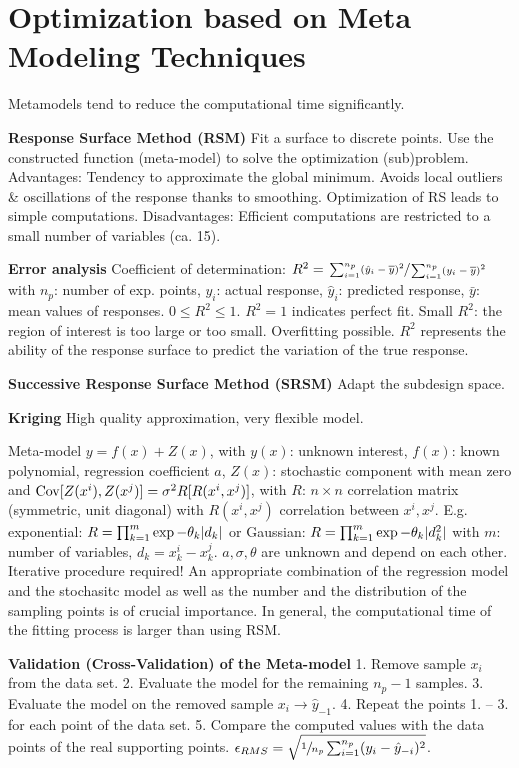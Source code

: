 \section*{Optimization based on Meta Modeling Techniques}
Metamodels tend to reduce the computational time significantly.

\textbf{Response Surface Method (RSM)}
Fit a surface to discrete points. Use the constructed function (meta-model) to solve the optimization (sub)problem.
Advantages: Tendency to approximate the global minimum. Avoids local outliers \& oscillations of the response thanks to smoothing. 
Optimization of RS leads to simple computations. 
Disadvantages: Efficient computations are restricted to a small number of variables (ca. 15).

\textbf{Error analysis}
Coefficient of determination:
$R^2 = \sfrac{\sum_{i=1}^{n_p} (\hat{y}_i-\overline{y})^2}{\sum_{i=1}^{n_p} (y_i-\overline{y})^2}$
with $n_p$: number of exp. points, $y_i$: actual response, $\hat{y}_i$: predicted response, $\bar{y}$: mean values of responses.
$0\leq R^2 \leq 1$. $R^2=1$ indicates perfect fit.
Small $R^2$: the region of interest is too large or too small.
Overfitting possible. 
$R^2$ represents the ability of the response surface to predict the variation of the true response.

\textbf{Successive Response Surface Method (SRSM)}
Adapt the subdesign space.

\textbf{Kriging}
High quality approximation, very flexible model. 

Meta-model $y=f(x)+Z(x)$, with $y(x)$: unknown interest, $f(x)$: known polynomial, regression coefficient $a$, $Z(x)$: stochastic component with mean zero and $\mathrm{Cov}{[Z(x^i), Z(x^j)]} = \sigma^2 R[R(x^i, x^j)]$, with $R$: $n\times n$ correlation matrix (symmetric, unit diagonal) with $R(x^i, x^j)$ correlation between $x^i, x^j$.
E.g. exponential: $R=\prod_{k=1}^{m}\exp{-\theta_k \lvert d_k \rvert}$ or Gaussian: $R=\prod_{k=1}^{m}\exp{-\theta_k \lvert d_k^2 \rvert}$ with $m$: number of variables, $d_k=x_k^i - x_k ^j$.
$a, \sigma, \theta$ are unknown and depend on each other. 
Iterative procedure required!
An appropriate combination of the regression model and the stochasitc model as well as the number and the distribution of the sampling points is of crucial importance.
In general, the computational time of the fitting process is larger than using RSM.

\textbf{Validation (Cross-Validation) of the Meta-model}
1. Remove sample $x_i$ from the data set.
2. Evaluate the model for the remaining $n_p - 1$ samples.
3. Evaluate the model on the removed sample $x_i \rightarrow \hat{y}_{-1}$.
4. Repeat the points 1. – 3. for each point of the data set.
5. Compare the computed values with the data points of the real supporting points.
$\epsilon_{RMS}=\sqrt{\sfrac{1}{n_p} \sum_{i=1}^{n_p} (y_i-\hat{y}_{-i})^2}$.


